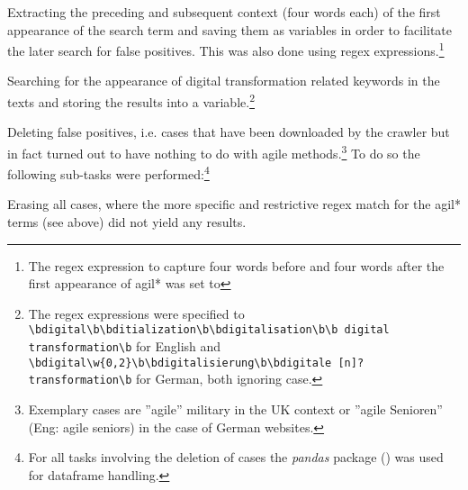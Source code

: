\begin{compactitem}
\item Extracting the preceding and subsequent context (four words each) of the first appearance of the search term and saving them as variables in order to facilitate the later search for false positives. This was also done using regex expressions.\footnote{The regex expression to capture four words before and four words after the first appearance of agil* was set to }
\item Searching for the appearance of digital transformation related keywords in the texts and storing the results into a variable.\footnote{The regex expressions were specified to \texttt{\textbackslash bdigital\textbackslash b\textbar \textbackslash bditialization\textbackslash b\textbar \textbackslash bdigitalisation\textbackslash b\textbar \textbackslash b digital transformation\textbackslash b} for English and \texttt{\textbackslash bdigital\textbackslash w\{0,2\}\textbackslash b\textbar \textbackslash bdigitalisierung\textbackslash b\textbar \textbackslash bdigitale [n]? transformation\textbackslash b} for German, both ignoring case.}
\item Deleting false positives, i.e. cases that have been downloaded by the crawler but in fact turned out to have nothing to do with agile methods.\footnote{Exemplary cases are ”agile” military in the UK context or ”agile Senioren” (Eng: agile seniors) in the case of German websites.} To do so the following sub-tasks were performed:\footnote{For all tasks involving the deletion of cases the \textit{pandas} package (\cite{McKinney2010}) was used for dataframe handling.}
    \begin{compactitem}
    \item Erasing all cases, where the more specific and restrictive regex match for the agil* terms (see above) did not yield any results. 

\end{compactitem}
\end{compactitem}
